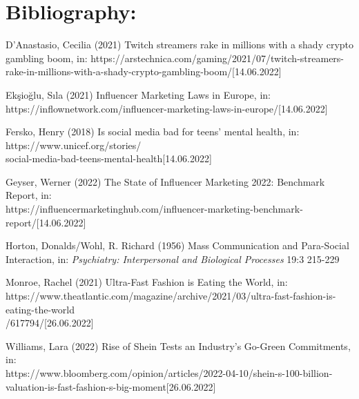 \documentclass{article}
\begin{document}
	\section*{Bibliography:}
	\begin{list}{}{\setlength{\leftmargin}{1cm}\setlength{\itemindent}{-1cm}}
	\item{D'Anastasio, Cecilia (2021) \glqq Twitch streamers rake in millions with a shady crypto gambling boom\grqq, in: https://arstechnica.com/gaming/2021/07/twitch-streamers-rake-in-millions-with-a-shady-crypto-gambling-boom/[14.06.2022]}
	\item{Ekşioğlu, Sıla (2021) \glqq Influencer Marketing Laws in Europe\grqq, in: https://inflownetwork.com/influencer-marketing-laws-in-europe/[14.06.2022]}
	\item{Fersko, Henry (2018) \glqq Is social media bad for teens' mental health\grqq, in: https://www.unicef.org/stories/\\social-media-bad-teens-mental-health[14.06.2022]}
	\item{Geyser, Werner (2022) \glqq The State of Influencer Marketing 2022: Benchmark Report\grqq, in: \\https://influencermarketinghub.com/influencer-marketing-benchmark-report/[14.06.2022]}
	\item{Horton, Donalds/Wohl, R. Richard (1956) \glqq Mass Communication and Para-Social Interaction\grqq, in: \textit{Psychiatry: Interpersonal and Biological Processes} 19:3 215-229}
	\item{Monroe, Rachel (2021) \glqq Ultra-Fast Fashion is Eating the World\grqq, in: \\ https://www.theatlantic.com/magazine/archive/2021/03/ultra-fast-fashion-is-eating-the-world\\/617794/[26.06.2022]}
	\item{Williams, Lara (2022) \glqq Rise of Shein Tests an Industry’s Go-Green Commitments\grqq, in: \\ https://www.bloomberg.com/opinion/articles/2022-04-10/shein-s-100-billion-valuation-is-fast-fashion-s-big-moment[26.06.2022]}
	\end{list}

	
\end{document}
